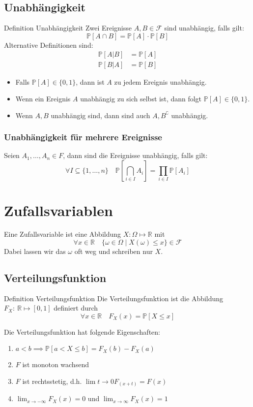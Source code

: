 \documentclass[a4paper,10pt]{article}
\def\R{\mathbb{R}}
\def\P{\mathbb{P}}
\def\F{\mathcal{F}}
\begin{document}
\subsection{Unabhängigkeit}
\begin{mainbox}{Definition Unabhängigkeit}
    Zwei Ereignisse \(A, B\in \F\) sind unabhängig, falls gilt:
    \[\P[A\cap B] = \P[A] \cdot \P[B]\]
    Alternative Definitionen sind:
    \begin{align*}
        \P[A|B] & = \P[A] \\
        \P[B|A] & = \P[B]
    \end{align*}
\end{mainbox}
\begin{itemize}
    \item Falls \(\P[A] \in \{0,1\}\), dann ist \(A\) zu jedem Ereignis unabhängig.
    \item Wenn ein Ereignis \(A\) unabhängig zu sich selbst ist, dann folgt \(\P[A] \in \{0,1\}\).
    \item Wenn \(A, B\) unabhängig sind, dann sind auch \(A, B^\complement\) unabhängig.
\end{itemize}
\subsubsection*{Unabhängigkeit für mehrere Ereignisse}
Seien \(A_1, \ldots, A_n \in F\), dann sind die Ereignisse unabhängig, falls gilt:
\[\forall I \subseteq \{1, \ldots, n\} \quad \P[\bigcap_{i\in I}A_i] = \prod_{i\in I} \P[A_i]\]

\section{Zufallsvariablen}
Eine Zufallsvariable ist eine Abbildung \(X: \Omega \mapsto \R\) mit
\[\forall x \in \R \quad \{\omega \in \Omega \mid X(\omega) \leq x\} \in \F\]
Dabei lassen wir das \(\omega\) oft weg und schreiben nur \(X\).

\subsection{Verteilungsfunktion}
\begin{mainbox}{Definition Verteilungsfunktion}
    Die Verteilungsfunktion ist die Abbildung \(F_X: \ \R \mapsto [0,1]\) definiert durch
    \[\forall x \in \R \quad F_X(x) = \P[X \le x]\]
\end{mainbox}
Die Verteilungsfunktion hat folgende Eigenschaften:
\begin{enumerate}
    \item \(a < b \implies \P[a < X \le b] = F_X(b) - F_X(a)\)
    \item \(F\) ist monoton wachsend
    \item \(F\) ist rechtsstetig, d.h. \(\lim{t \to 0} F_(x+t) = F(x)\)
    \item \(\lim_{x\to - \infty} F_X(x) = 0\) und \(\lim_{x\to \infty} F_X(x) = 1\)
\end{enumerate}
\end{document}
